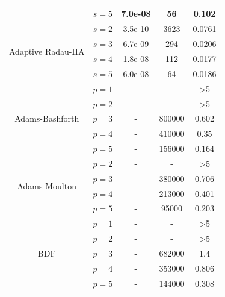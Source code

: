 \documentclass[lang=cn,10pt,bibend=bibtex]{elegantbook}
\begin{document}
\begin{table}[htbp]
\begin{tabular}{cc|ccc}
  \multicolumn{1}{c|}{}                         & \multicolumn{1}{c|}{$s=5$} & 7.0e-08 & 56 & 0.102  \\ \hline
  \multicolumn{1}{c|}{\multirow{4}{*}{Adaptive Radau-IIA}}    & \multicolumn{1}{c|}{$s=2$} & 3.5e-10 & 3623 & 0.0761\\
  \multicolumn{1}{c|}{}                         & \multicolumn{1}{c|}{$s=3$} & 6.7e-09 & 294 & 0.0206  \\
  \multicolumn{1}{c|}{}                         & \multicolumn{1}{c|}{$s=4$} & 1.8e-08 & 112 & 0.0177 \\
  \multicolumn{1}{c|}{}                         & \multicolumn{1}{c|}{$s=5$} & 6.0e-08 & 64 & 0.0186  \\ \hline
  \multicolumn{1}{c|}{\multirow{5}{*}{Adams-Bashforth}}    & \multicolumn{1}{c|}{$p=1$} & - & - & >5\\
  \multicolumn{1}{c|}{}                         & \multicolumn{1}{c|}{$p=2$} & - & - & >5  \\
  \multicolumn{1}{c|}{}                         & \multicolumn{1}{c|}{$p=3$} & - & 800000 & 0.602 \\
  \multicolumn{1}{c|}{}                         & \multicolumn{1}{c|}{$p=4$} & - & 410000 & 0.35  \\ 
  \multicolumn{1}{c|}{}                         & \multicolumn{1}{c|}{$p=5$} & - & 156000 & 0.164  \\ \hline
  \multicolumn{1}{c|}{\multirow{4}{*}{Adams-Moulton}}    & \multicolumn{1}{c|}{$p=2$} & - & - & >5\\
  \multicolumn{1}{c|}{}                         & \multicolumn{1}{c|}{$p=3$} & - & 380000 & 0.706  \\
  \multicolumn{1}{c|}{}                         & \multicolumn{1}{c|}{$p=4$} & - & 213000 & 0.401 \\
  \multicolumn{1}{c|}{}                         & \multicolumn{1}{c|}{$p=5$} & - & 95000 & 0.203  \\ \hline
  \multicolumn{1}{c|}{\multirow{5}{*}{BDF}}    & \multicolumn{1}{c|}{$p=1$} & - & - & >5\\
  \multicolumn{1}{c|}{}                         & \multicolumn{1}{c|}{$p=2$} & - & - & >5  \\
  \multicolumn{1}{c|}{}                         & \multicolumn{1}{c|}{$p=3$} & - & 682000 & 1.4 \\
  \multicolumn{1}{c|}{}                         & \multicolumn{1}{c|}{$p=4$} & - & 353000 & 0.806  \\ 
  \multicolumn{1}{c|}{}                         & \multicolumn{1}{c|}{$p=5$} & - & 144000 & 0.308  \\ \hline
  \end{tabular}
\end{table}
\vspace{-.8em}
\end{document}
